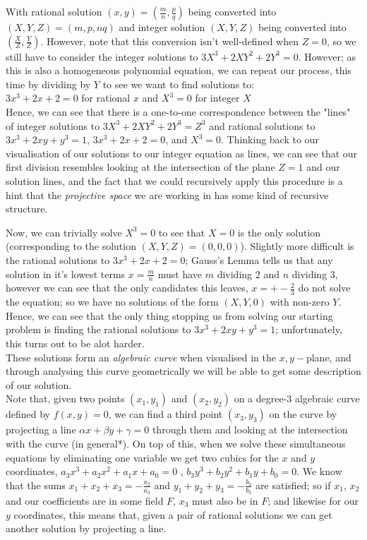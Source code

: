 \documentclass{article}
\begin{document}
With rational solution $(x, y) = (\frac{m}{n}, \frac{p}{q})$ being converted into $(X, Y, Z) = (m, p, nq)$ and integer solution $(X, Y, Z)$ being converted into $(\frac{X}{Z}, \frac{Y}{Z})$. However, note that this conversion isn't well-defined when $Z = 0$, so we still have to consider the integer solutions to $3 X^3 +  2 X Y^2 + 2 Y^3 = 0$. However; as this is also a homogeneous polynomial equation, we can repeat our process, this time by dividing by $Y$ to see we want to find solutions to: \\

$3 x^3 + 2 x + 2 = 0$ \quad for rational $x$ and $X^3 = 0$ for integer $X$\\

Hence, we can see that there is a one-to-one correspondence between the "lines" of integer solutions to $3 X^3 +  2 X Y^2 + 2 Y^3 = Z^3$ and rational solutions to  $3x^3 + 2xy + y^3 = 1$, \quad $3 x^3 + 2 x + 2 = 0$, and $X^3 = 0$. Thinking back to our visualisation of our solutions to our integer equation as lines, we can see that our first division resembles looking at the intersection of the plane $Z = 1$ and our solution lines, and the fact that we could recursively apply this procedure is a hint that the \emph{projective space} we are working in has some kind of recursive structure.

Now, we can trivially solve $X^3 = 0 $ to see that $X = 0$ is the only solution (corresponding to the solution $(X, Y, Z) = (0, 0, 0)$). Slightly more difficult is the rational solutions to $3x^3 + 2 x + 2 = 0$; Gauss's Lemma tells us that any solution in it's lowest terms $x = \frac{m}{n}$ must have $m$ dividing $2$ and $n$ dividing $3$, however we can see that the only candidates this leaves, $x = +-\frac{2}{3}$ do not solve the equation; so we have no solutions of the form $(X, Y, 0)$ with non-zero $Y$. Hence, we can see that the only thing stopping us from solving our starting problem is finding the rational solutions to  $3x^3 + 2xy + y^3 = 1$; unfortunately, this turns out to be alot harder. \\

These solutions form an \emph{algebraic curve} when visualised in the $x,y-$plane, and through analysing this curve geometrically we will be able to get some description of our solution.\\

Note that, given two points $(x_1, y_1)$ and $(x_2, y_2)$ on a degree-3 algebraic curve defined by $f(x, y) = 0$, we can find a third point $(x_3, y_3)$ on the curve by projecting a line $\alpha x + \beta y + \gamma = 0$ through them and looking at the intersection with the curve (in general*). On top of this, when we solve these simultaneous equations by eliminating one variable we get two cubics for the $x$ and $y$ coordinates, $a_3 x^3 + a_2 x^2 + a_1 x + a_0 = 0$ , \quad $b_3 y^3 + b_2 y^2 + b_1 y + b_0 = 0$. We know that the sums $x_1 + x_2 + x_3 = -\frac{a_2}{a_3}$ and $y_1 + y_2 + y_3 = -\frac{b_2}{b_3}$ are satisfied; so if $x_1$, $x_2$ and our coefficients are in some field $F$, $x_3$ must also be in $F$; and likewise for our $y$ coordinates, this means that, given a pair of rational solutions we can get another solution by projecting a line.
\end{document}
